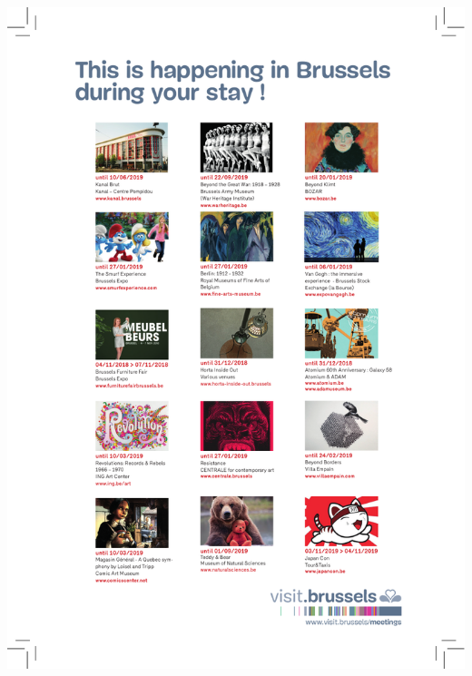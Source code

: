 \thispagestyle{empty}
\begin{center}
  \vfill
  \includegraphics[width=\textwidth]{content/ads/full/brussels.pdf}
  \vfill
\end{center}

